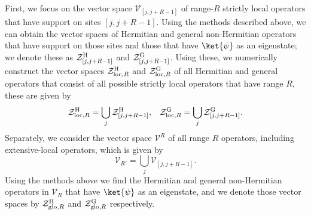 \documentclass[prx,letterpaper,aps,superscriptaddress,floatfix,twocolumn,nofootinbib]{revtex4-2}
\theoremstyle{definition}
\newcommand{\loc}{\text{loc}}
\newcommand{\mZ}{\mathcal{Z}}
\newcommand{\mV}{\mathcal{V}}
\begin{document}
%
First, we focus on the vector space  $\mV_{[j, j+R-1]}$ of range-$R$ strictly local operators that have support on sites $[j, j+R-1]$.
%
Using the methods described above, we can obtain the vector spaces of Hermitian and general non-Hermitian operators that have support on those sites and those that have $\ket{\psi}$ as an eigenstate; we denote these as $\mZ^{\rm H}_{[j, j+R-1]}$ and $\mZ^{\rm G}_{[j, j+R-1]}$.
%
Using these, we numerically construct the vector spaces $\mZ^{\rm H}_{\loc,R}$ and $\mZ^{\rm G}_{{\rm loc},R}$ of all Hermitian and general operators that consist of all possible strictly local operators that have range $R$, these are given by
\begin{equation}
    \mZ^{\rm H}_{{\rm loc},R} = \bigcup_j\mZ^{\rm H}_{[j, j+R-1]},\;\;\;\mZ^{\rm G}_{{\rm loc}, R} = \bigcup_j\mZ^{\rm G}_{[j, j+R-1]}.
\end{equation}
%
Separately, we consider the vector space $\mV^{R}$ of all range $R$ operators, including extensive-local operators, which is given by
\begin{equation}
    \mV_{R'} = \bigcup_j{\mV_{[j, j+R-1]}}.
\end{equation}
%
Using the methods above we find the Hermitian and general non-Hermitian operators in $\mV_{R}$ that have $\ket{\psi}$ as an eigenstate, and we denote those vector spaces by $\mZ^{\rm H}_{{\rm glo}, R}$ and $\mZ^{\rm G}_{{\rm glo}, R}$ respectively.
%
\end{document}
